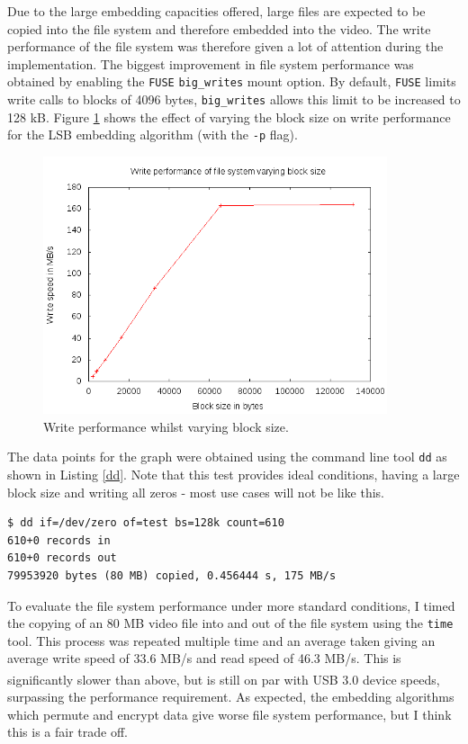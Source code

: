 \documentclass[paper=a4, fontsize=11pt,twoside]{scrartcl}
\numberwithin{table}{section}
\numberwithin{figure}{section}
\numberwithin{algorithm}{section}
\begin{document}
Due to the large embedding capacities offered, large files are expected to be copied into the file system and therefore embedded into the video. The write performance of the file system was therefore given a lot of attention during the implementation. The biggest improvement in file system performance was obtained by enabling the \texttt{FUSE} \texttt{big\_writes} mount option. By default, \texttt{FUSE} limits write calls to blocks of 4096 bytes, \texttt{big\_writes} allows this limit to be increased to 128 kB. Figure \ref{writeper} shows the effect of varying the block size on write performance for the LSB embedding algorithm (with the \texttt{-p} flag).

\begin{figure}[!tbh]
\centerline{\includegraphics[width=0.9\textwidth]{images/writeper.png}}
\caption{Write performance whilst varying block size.}
\label{writeper}
\end{figure}

The data points for the graph were obtained using the command line tool \texttt{dd} as shown in Listing \ref{dd}. Note that this test provides ideal conditions, having a large block size and writing all zeros - most use cases will not be like this.

\begin{lstlisting}[caption={Testing the file system performance using \texttt{dd}.}, frame=single, label=dd, float, floatplacement=!htHb]
$ dd if=/dev/zero of=test bs=128k count=610
610+0 records in
610+0 records out
79953920 bytes (80 MB) copied, 0.456444 s, 175 MB/s
\end{lstlisting}

To evaluate the file system performance under more standard conditions, I timed the copying of an 80 MB video file into and out of the file system using the \texttt{time} tool. This process was repeated multiple time and an average taken giving an average write speed of 33.6 MB/s and read speed of 46.3 MB/s. This is significantly slower than above, but is still on par with USB 3.0 device speeds\textsuperscript{\cite{usb3}}, surpassing the performance requirement. As expected, the embedding algorithms which permute and encrypt data give worse file system performance, but I think this is a fair trade off.
\end{document}
